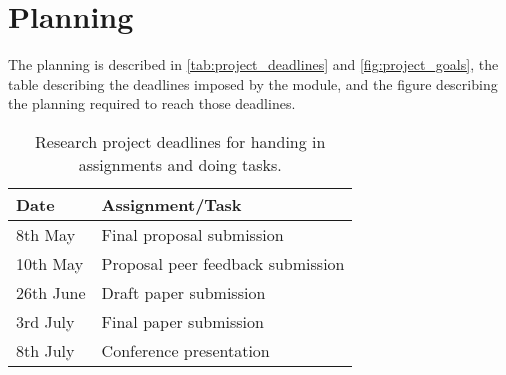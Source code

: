 \section{Planning}

The planning is described in \autoref{tab:project_deadlines} and \autoref{fig:project_goals}, the table describing the deadlines imposed by the module, and the figure describing the planning required to reach those deadlines.

\begin{table}[h]
\begin{tabular}{l|l}
\hline
Date      & Assignment/Task                   \\ \hline
8th May   & Final proposal submission         \\ \hline
10th May  & Proposal peer feedback submission \\ \hline
26th June & Draft paper submission            \\ \hline
3rd July  & Final paper submission            \\ \hline
8th July  & Conference presentation           \\ \hline
\end{tabular}
\caption{Research project deadlines for handing in assignments and doing tasks.}
\label{tab:project_deadlines}
\end{table}

